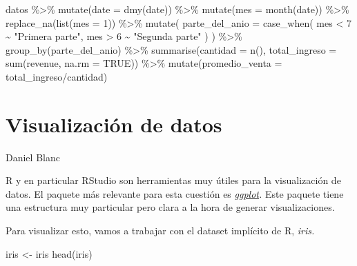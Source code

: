 \documentclass[
  letterpaper,
  DIV=11,
  numbers=noendperiod]{scrreprt}
\newenvironment{Shaded}{\begin{snugshade}}{\end{snugshade}}
\newcommand{\AttributeTok}[1]{\textcolor[rgb]{0.40,0.45,0.13}{#1}}
\newcommand{\ConstantTok}[1]{\textcolor[rgb]{0.56,0.35,0.01}{#1}}
\newcommand{\DecValTok}[1]{\textcolor[rgb]{0.68,0.00,0.00}{#1}}
\newcommand{\FunctionTok}[1]{\textcolor[rgb]{0.28,0.35,0.67}{#1}}
\newcommand{\NormalTok}[1]{\textcolor[rgb]{0.00,0.23,0.31}{#1}}
\newcommand{\OtherTok}[1]{\textcolor[rgb]{0.00,0.23,0.31}{#1}}
\newcommand{\SpecialCharTok}[1]{\textcolor[rgb]{0.37,0.37,0.37}{#1}}
\newcommand{\StringTok}[1]{\textcolor[rgb]{0.13,0.47,0.30}{#1}}
\begin{document}
\begin{Shaded}
\begin{Highlighting}[]
\NormalTok{datos }\SpecialCharTok{\%\textgreater{}\%} 
  \FunctionTok{mutate}\NormalTok{(}\AttributeTok{date =} \FunctionTok{dmy}\NormalTok{(date)) }\SpecialCharTok{\%\textgreater{}\%} 
  \FunctionTok{mutate}\NormalTok{(}\AttributeTok{mes =} \FunctionTok{month}\NormalTok{(date)) }\SpecialCharTok{\%\textgreater{}\%}
  \FunctionTok{replace\_na}\NormalTok{(}\FunctionTok{list}\NormalTok{(}\AttributeTok{mes =} \DecValTok{1}\NormalTok{)) }\SpecialCharTok{\%\textgreater{}\%} 
  \FunctionTok{mutate}\NormalTok{(}
    \AttributeTok{parte\_del\_anio =} \FunctionTok{case\_when}\NormalTok{(}
\NormalTok{      mes }\SpecialCharTok{\textless{}} \DecValTok{7} \SpecialCharTok{\textasciitilde{}} \StringTok{"Primera parte"}\NormalTok{,}
\NormalTok{      mes }\SpecialCharTok{\textgreater{}} \DecValTok{6} \SpecialCharTok{\textasciitilde{}} \StringTok{"Segunda parte"}
\NormalTok{    )}
\NormalTok{  ) }\SpecialCharTok{\%\textgreater{}\%} 
  \FunctionTok{group\_by}\NormalTok{(parte\_del\_anio) }\SpecialCharTok{\%\textgreater{}\%} 
  \FunctionTok{summarise}\NormalTok{(}\AttributeTok{cantidad =} \FunctionTok{n}\NormalTok{(), }\AttributeTok{total\_ingreso =} \FunctionTok{sum}\NormalTok{(revenue, }\AttributeTok{na.rm =} \ConstantTok{TRUE}\NormalTok{)) }\SpecialCharTok{\%\textgreater{}\%}
  \FunctionTok{mutate}\NormalTok{(}\AttributeTok{promedio\_venta =}\NormalTok{ total\_ingreso}\SpecialCharTok{/}\NormalTok{cantidad)}
\end{Highlighting}
\end{Shaded}


\hypertarget{visualizaciuxf3n-de-datos}{%
\chapter{Visualización de datos}\label{visualizaciuxf3n-de-datos}}

Daniel Blanc

\hfill\break

R y en particular RStudio son herramientas muy útiles para la
visualización de datos. El paquete más relevante para esta cuestión es
\href{https://www.rdocumentation.org/packages/ggplot2/versions/3.3.6}{\emph{ggplot}}\emph{.}
Este paquete tiene una estructura muy particular pero clara a la hora de
generar visualizaciones.

Para visualizar esto, vamos a trabajar con el dataset implícito de R,
\emph{iris.}

\begin{Shaded}
\begin{Highlighting}[]
\NormalTok{iris }\OtherTok{\textless{}{-}}\NormalTok{ iris}
\FunctionTok{head}\NormalTok{(iris)}
\end{Highlighting}
\end{Shaded}
\end{document}
